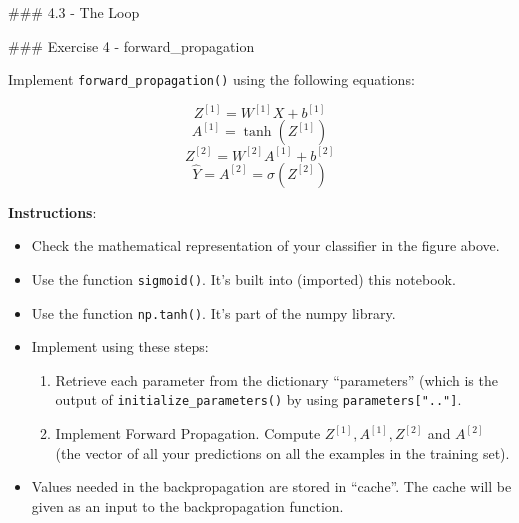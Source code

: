 \documentclass[11pt]{article}
\providecommand{\tightlist}{%
      \setlength{\itemsep}{0pt}\setlength{\parskip}{0pt}}
\begin{document}
    \#\#\# 4.3 - The Loop

\#\#\# Exercise 4 - forward\_propagation

Implement \texttt{forward\_propagation()} using the following equations:

\[Z^{[1]} =  W^{[1]} X + b^{[1]}\tag{1}\]
\[A^{[1]} = \tanh(Z^{[1]})\tag{2}\]
\[Z^{[2]} = W^{[2]} A^{[1]} + b^{[2]}\tag{3}\]
\[\hat{Y} = A^{[2]} = \sigma(Z^{[2]})\tag{4}\]

\textbf{Instructions}:

\begin{itemize}
\tightlist
\item
  Check the mathematical representation of your classifier in the figure
  above.
\item
  Use the function \texttt{sigmoid()}. It's built into (imported) this
  notebook.
\item
  Use the function \texttt{np.tanh()}. It's part of the numpy library.
\item
  Implement using these steps:

  \begin{enumerate}
  \def\labelenumi{\arabic{enumi}.}
  \tightlist
  \item
    Retrieve each parameter from the dictionary ``parameters'' (which is
    the output of \texttt{initialize\_parameters()} by using
    \texttt{parameters{[}".."{]}}.
  \item
    Implement Forward Propagation. Compute \(Z^{[1]}, A^{[1]}, Z^{[2]}\)
    and \(A^{[2]}\) (the vector of all your predictions on all the
    examples in the training set).
  \end{enumerate}
\item
  Values needed in the backpropagation are stored in ``cache''. The
  cache will be given as an input to the backpropagation function.
\end{itemize}
\end{document}
